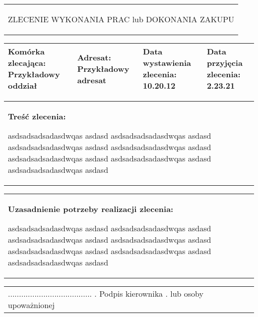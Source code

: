 \documentclass[11pt,a4paper]{article}
\begin{document}
\begin{tabularx}{\linewidth}{X}
\begin{center}
ZLECENIE WYKONANIA PRAC lub DOKONANIA ZAKUPU
\end{center}
\end{tabularx}

\begin{tabularx}{\textwidth}{|X|X|X|X|}
\hline
{\scriptsize \textbf{Komórka zlecająca:}}\newline
\newline
{} Przykładowy oddział \newline
& {\scriptsize \textbf{Adresat:}}\newline
\newline
{} Przykładowy adresat\newline 
& {\scriptsize \textbf{Data wystawienia zlecenia:}}\newline
\newline
{} 10.20.12 \newline
& {\scriptsize \textbf{Data przyjęcia zlecenia:}}\newline
\newline
{} 2.23.21 \newline
\\ \hline
\end{tabularx}

\begin{tabularx}{\linewidth}{|X|}
{\footnotesize \textbf{Treść zlecenia:}}\newline

{} asdsadsadsadasdwqas asdasd asdsadsadsadasdwqas asdasd asdsadsadsadasdwqas asdasd asdsadsadsadasdwqas asdasd asdsadsadsadasdwqas asdasd asdsadsadsadasdwqas asdasd asdsadsadsadasdwqas asdasd 
\newline
\\
\end{tabularx}


\begin{tabularx}{\linewidth}{|X|}
{\footnotesize \textbf{Uzasadnienie potrzeby realizacji zlecenia:}}\newline

{} asdsadsadsadasdwqas asdasd asdsadsadsadasdwqas asdasd asdsadsadsadasdwqas asdasd asdsadsadsadasdwqas asdasd asdsadsadsadasdwqas asdasd asdsadsadsadasdwqas asdasd asdsadsadsadasdwqas asdasd 
\newline 
\\
\end{tabularx}

\begin{tabularx}{\linewidth}{|X|}

\hspace{14.5cm} {\scriptsize ......................................} \newline .
\hspace{14.5cm} {\scriptsize Podpis kierownika} \newline .
\hspace{14.2cm} {\scriptsize lub osoby upoważnionej}
\end{tabularx}
\end{document}
